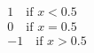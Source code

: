 \documentclass[preview]{standalone}
\begin{document}
\begin{align*}
1 \quad \text{if $x < 0.5$} \\
            0 \quad \text{if $x = 0.5$} \\
            -1 \quad \text{if $x > 0.5$} \\
\end{align*}
\end{document}

